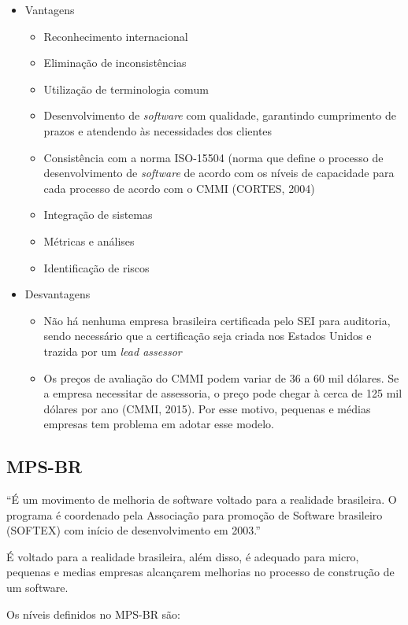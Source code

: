 \begin{itemize}
	\item Vantagens
		\begin{itemize}
			\item Reconhecimento internacional
			\item Eliminação de inconsistências
			\item Utilização de terminologia comum
			\item Desenvolvimento de \textit{software} com qualidade, garantindo cumprimento de prazos e atendendo às necessidades dos clientes 
			\item Consistência com a norma ISO-15504 (norma que define o processo de desenvolvimento de \textit{software} de acordo com os níveis de capacidade para cada processo de acordo com o CMMI (CORTES, 2004)
			\item Integração de sistemas
			\item Métricas e análises
			\item Identificação de riscos
		\end{itemize}
	\item Desvantagens
		\begin{itemize}
			\item Não há nenhuma empresa brasileira certificada pelo SEI para auditoria, sendo necessário que a certificação seja criada nos Estados Unidos e trazida por um \textit{lead assessor}
			\item Os preços de avaliação do CMMI podem variar de 36 a 60 mil dólares. Se a empresa necessitar de assessoria, o preço pode chegar à cerca de 125 mil dólares por ano (CMMI, 2015). Por esse motivo, pequenas e médias empresas tem problema em adotar esse modelo.
		\end{itemize}
\end{itemize}

\subsection{MPS-BR}

“É um movimento de melhoria de software voltado para a realidade brasileira. O programa é coordenado pela Associação para promoção de Software brasileiro (SOFTEX) com início de desenvolvimento em 2003.”~\cite{softex}

É voltado para a realidade brasileira, 	além disso, é adequado para micro, pequenas e medias empresas alcançarem melhorias no processo de construção de um software.

Os níveis definidos no MPS-BR são:

